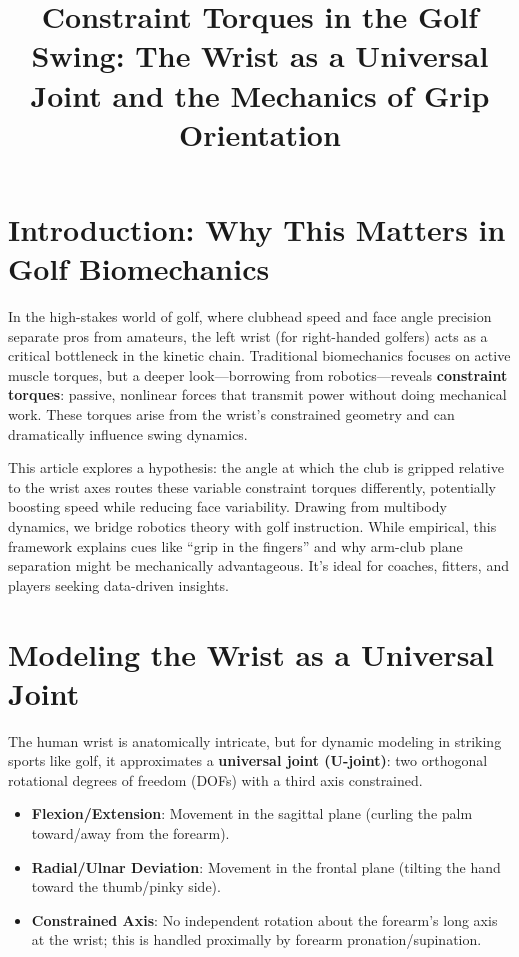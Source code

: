 \documentclass[11pt]{article}
\title{Constraint Torques in the Golf Swing: The Wrist as a Universal Joint and the Mechanics of Grip Orientation}
\author{}
\date{}
\begin{document}
\maketitle

\section{Introduction: Why This Matters in Golf Biomechanics}

In the high-stakes world of golf, where clubhead speed and face angle precision separate pros from amateurs, the left wrist (for right-handed golfers) acts as a critical bottleneck in the kinetic chain. Traditional biomechanics focuses on active muscle torques, but a deeper look—borrowing from robotics—reveals \textbf{constraint torques}: passive, nonlinear forces that transmit power without doing mechanical work. These torques arise from the wrist's constrained geometry and can dramatically influence swing dynamics.

This article explores a hypothesis: the angle at which the club is gripped relative to the wrist axes routes these variable constraint torques differently, potentially boosting speed while reducing face variability. Drawing from multibody dynamics, we bridge robotics theory with golf instruction. While empirical, this framework explains cues like ``grip in the fingers'' and why arm-club plane separation might be mechanically advantageous. It's ideal for coaches, fitters, and players seeking data-driven insights.

\section{Modeling the Wrist as a Universal Joint}

The human wrist is anatomically intricate, but for dynamic modeling in striking sports like golf, it approximates a \textbf{universal joint (U-joint)}: two orthogonal rotational degrees of freedom (DOFs) with a third axis constrained.

\begin{itemize}
    \item \textbf{Flexion/Extension}: Movement in the sagittal plane (curling the palm toward/away from the forearm).
    \item \textbf{Radial/Ulnar Deviation}: Movement in the frontal plane (tilting the hand toward the thumb/pinky side).
    \item \textbf{Constrained Axis}: No independent rotation about the forearm's long axis at the wrist; this is handled proximally by forearm pronation/supination.
\end{itemize}
\end{document}
